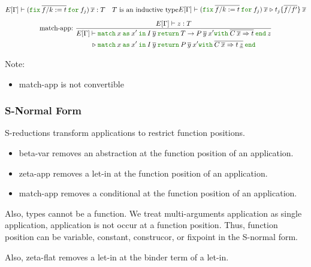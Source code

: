 \documentclass[a4paper,fleqn]{article}
\newcommand{\kwin}{\mbox{\color{mygreen}\ttfamily in}}
\newcommand{\kwmatch}{\mbox{\color{mygreen}\ttfamily match}}
\newcommand{\kwas}{\mbox{\color{mygreen}\ttfamily as}}
\newcommand{\kwreturn}{\mbox{\color{mygreen}\ttfamily return}}
\newcommand{\kwwith}{\mbox{\color{mygreen}\ttfamily with}}
\newcommand{\kwend}{\mbox{\color{mygreen}\ttfamily end}}
\newcommand{\kwfix}{\mbox{\color{mygreen}\ttfamily fix}}
\newcommand{\kwfor}{\mbox{\color{mygreen}\ttfamily for}}
\newcommand{\ofix}[2]{\kwfix\:{#1}\:\kwfor\:{#2}}
\newcommand{\breakrule}{\\[0.5em]}
\newcommand{\substm}[3]{#1\{\overline{#2/#3}\}}
\newcommand{\reltri}{\mathrel{\triangleright}}
\newcommand{\rep}[1]{\overline{#1}}
\begin{document}
\begin{gather*}
{\begin{gathered}
        E[\Gamma] \vdash (\ofix{\rep{f/k:=t}}{f_j})\:\rep{x} : T \quad
        \text{$T$ is an inductive type}
      \end{gathered}
    }{
      E[\Gamma] \vdash
      (\ofix{\rep{f/k:=t}}{f_j})\:\rep{x}
      \reltri
      \substm{t_j}{f}{f'} \:\rep{x}
    } \breakrule
  \text{match-app:}~
    \dfrac
    {
      E[\Gamma] \vdash z : T
    }{
      \begin{aligned}
        E[\Gamma] \vdash\; &
          \kwmatch\:x\:
          \kwas\:x'\:
          \kwin\:I\:\rep{y}\:
          \kwreturn\:{T \rightarrow P\:\rep{y}\:x'}
          \kwwith\:\rep{{C\: \rep{x}} \Rightarrow {t}}\:
          \kwend\:z \\
        \reltri\; &
          \kwmatch\:x\:
          \kwas\:x'\:
          \kwin\:I\:\rep{y}\:
          \kwreturn\:{P\:\rep{y}\:x'}
          \kwwith\:\rep{{C\: \rep{x}} \Rightarrow {t\:\underline{z}}}\:
          \kwend
      \end{aligned}
    }
\end{gather*}

{\small Note:
\begin{itemize}
  \item match-app is not convertible
\end{itemize}}

\subsubsection{S-Normal Form}\label{sec:s-normal-form}
S-reductions transform applications to restrict function positions.
\begin{itemize}
  \item beta-var removes an abstraction at the function position of an application.
  \item zeta-app removes a let-in at the function position of an application.
  \item match-app removes a conditional at the function position of an application.
\end{itemize}
Also, types cannot be a function.
We treat multi-arguments application as single application, application is not occur at a function position.
Thus, function position can be variable, constant, construcor, or fixpoint in the S-normal form.

Also, zeta-flat removes a let-in at the binder term of a let-in.
\end{document}
